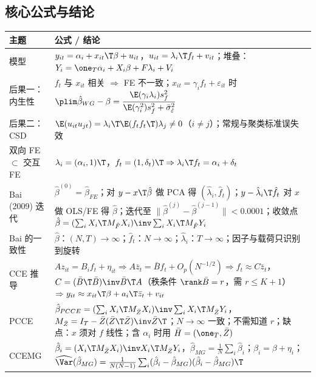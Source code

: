 \subsection{核心公式与结论}

\begin{center}
\small
\begin{tabularx}{\linewidth}{>{\raggedright\arraybackslash}p{2.5cm}L}
\toprule
主题 & 公式 / 结论\\
\midrule
模型 & $y_{it}=\alpha_i+x_{it}\T\beta+u_{it}$，$u_{it}=\lambda_i\T f_t+v_{it}$；堆叠：$Y_i=\one_T\alpha_i+X_i\beta+F\lambda_i+V_i$\\
后果一：内生性 & $f_t$ 与 $x_{it}$ 相关 $\Rightarrow$ FE 不一致；$x_{it}=\gamma_if_t+\varepsilon_{it}$ 时 $\plim\hat\beta_{WG}-\beta=\dfrac{\E(\gamma_i\lambda_i)s_f^2}{\E(\gamma_i^2)s_f^2+\bar\sigma^2_{\dot\varepsilon}}$\\
后果二：CSD & $\E(u_{it}u_{jt})=\lambda_i\T\E(f_tf_t\T)\lambda_j\neq0$（$i\neq j$）；常规与聚类标准误失效\\
双向 FE $\subset$ 交互 FE & $\lambda_i=(\alpha_i,1)\T$，$f_t=(1,\delta_t)\T\Rightarrow\lambda_i\T f_t=\alpha_i+\delta_t$\\
Bai (2009) 迭代 & $\hat\beta^{(0)}=\hat\beta_{FE}$；对 $y-x\T\hat\beta$ 做 PCA 得 $(\hat\lambda_i,\hat f_t)$；$y-\hat\lambda_i\T\hat f_t$ 对 $x$ 做 OLS/FE 得 $\hat\beta$；迭代至 $\|\hat\beta^{(j)}-\hat\beta^{(j-1)}\|<0.0001$；收敛点 $\hat\beta=(\sum_iX_i\T M_{\hat F}X_i)\inv\sum_iX_i\T M_{\hat F}Y_i$\\
Bai 的一致性 & $\hat\beta$：$(N,T)\to\infty$；$\hat f_t$：$N\to\infty$；$\hat\lambda_i$：$T\to\infty$；因子与载荷只识别到旋转\\
CCE 推导 & $Az_{it}=B_if_t+\eta_{it}\Rightarrow A\bar z_t=\bar Bf_t+O_p(N^{-1/2})\Rightarrow f_t\approx C\bar z_t$，$C=(\bar B\T\bar B)\inv\bar B\T A$（秩条件 $\rank\bar B=r$，需 $r\le K+1$）$\Rightarrow y_{it}\approx x_{it}\T\beta+a_i\T\bar z_t+v_{it}$\\
PCCE & $\hat\beta_{PCCE}=(\sum_iX_i\T M_{\bar Z}X_i)\inv\sum_iX_i\T M_{\bar Z}Y_i$，$M_{\bar Z}=I_T-\bar Z(\bar Z\T\bar Z)\inv\bar Z\T$；$N\to\infty$ 一致；不需知道 $r$；缺点：$x$ 须对 $f$ 线性；含 $\alpha_i$ 时用 $\bar H=(\one_T,\bar Z)$\\
CCEMG & $\hat\beta_i=(X_i\T M_{\bar Z}X_i)\inv X_i\T M_{\bar Z}Y_i$，$\hat\beta_{MG}=\frac1N\sum_i\hat\beta_i$；$\beta_i=\beta+\eta_i$；$\widehat\Var(\hat\beta_{MG})=\frac1{N(N-1)}\sum_i(\hat\beta_i-\hat\beta_{MG})(\hat\beta_i-\hat\beta_{MG})\T$\\

\end{tabularx}
\end{center}
